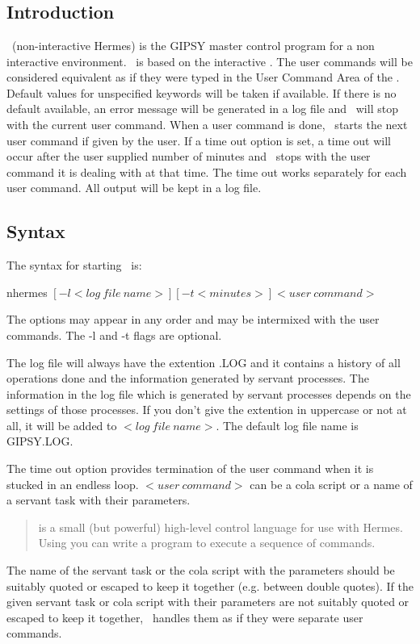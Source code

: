 \section{\nH}
\subsection{Introduction}
\nH\ (non-interactive Hermes) is the GIPSY master control program for a 
non interactive environment. \xH\ is based on the interactive \tH.
The user commands will be considered equivalent as if they were typed in the 
User Command Area of the \tH. Default values for 
unspecified keywords will be taken if available. If there is no
default available, an error message will be generated in a log
file and \nH\ will stop with the current user command.
When a user command is done, \nH\ starts the next user
command if given by the user.
If a time out option is set, a time out will occur after the user supplied 
number of minutes and \nH\ stops with the user command it is
dealing with at that time.
The time out works separately for each user command.
All output will be kept in a log file.

\subsection{Syntax}
The syntax for starting \nH\ is:

\begin{center}{nhermes $[ -l<log\ file\ name> ] [ -t<minutes> ] { <user\ command> }$}
\end{center}

The options may appear in any order and may be intermixed with the user 
commands. The -l and -t flags are optional.

The log file will always have the extention .LOG and it contains a history 
of all operations done and the information 
generated by servant processes. The information in the log file
which is generated by servant processes depends on the settings
of those processes. If you
don't give the extention in uppercase or not at all, it will be added 
to $<log\ file\ name>$. The default log file name is GIPSY.LOG.

The time out option provides termination of the user command when it is stucked 
in an endless loop.
$<user\ command>$ can be a cola script or a name of a servant task with their 
parameters. 
\begin{quote}
\small{ is a small (but powerful) high-level control language for
              use with Hermes.  Using  you can write a program to execute
              a sequence of commands.}
\end{quote}
The name of the servant task or the cola script with the 
parameters should be suitably quoted or escaped to keep it together 
(e.g. between double quotes). If the given servant task or cola script 
with their parameters are not suitably quoted or escaped to keep it 
together, \nH\  handles them as if they were separate user commands.

